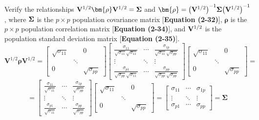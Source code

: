         Verify the relationships $\bold{V}^{1/2}\bm{\rho}\bold{V}^{1/2} = \bold{\Sigma}$ and $\bm{\rho} = {\left(\bold{V}^{1/2}\right)}^{-1}\bold{\Sigma}{\left(\bold{V}^{1/2}\right)}^{-1}$, where $\bold{\Sigma}$ is the
        $p \times p$ population covariance matrix [\textbf{Equation (2-32)}], $\bm{\rho}$ is the $p \times p$ population correlation
        matrix [\textbf{Equation (2-34)}], and $\bold{V}^{1/2}$ is the population standard deviation matrix
        [\textbf{Equation (2-35)}].
        \[
            \mathbf{V}^{1/2}\bm{\rho}\mathbf{V}^{1/2}
            =
            \begin{bmatrix}
                \sqrt{\sigma_{11}} & & 0 \\
                & \ddots & \\
                0 & & \sqrt{\sigma_{pp}}
            \end{bmatrix}
            \begin{bmatrix}
                \frac{\sigma_{11}}{\sqrt{\sigma_{11}}\sqrt{\sigma_{11}}} & \cdots & \frac{\sigma_{1p}}{\sqrt{\sigma_{11}}\sqrt{\sigma_{pp}}} \\
                \vdots & \ddots & \vdots \\
                \frac{\sigma_{p1}}{\sqrt{\sigma_{pp}}\sqrt{\sigma_{11}}} & \cdots & \frac{\sigma_{pp}}{\sqrt{\sigma_{pp}}\sqrt{\sigma_{pp}}}
            \end{bmatrix}
            \begin{bmatrix}
                \sqrt{\sigma_{11}} & & 0 \\
                & \ddots & \\
                0 & & \sqrt{\sigma_{pp}}
            \end{bmatrix}
            =
        \]
        \[
            =
            \begin{bmatrix}
                \frac{\sigma_{11}}{\sqrt{\sigma_{11}}} & \cdots & \frac{\sigma_{1p}}{\sqrt{\sigma_{pp}}} \\
                \vdots & \ddots & \vdots \\
                \frac{\sigma_{p1}}{\sqrt{\sigma_{11}}} & \cdots & \frac{\sigma_{pp}}{\sqrt{\sigma_{pp}}}
            \end{bmatrix}
            \begin{bmatrix}
                \sqrt{\sigma_{11}} & & 0 \\
                & \ddots & \\
                0 & & \sqrt{\sigma_{pp}}
            \end{bmatrix}
            =
            \begin{bmatrix}
                \sigma_{11} & \cdots & \sigma_{1p} \\
                \vdots & \ddots & \vdots \\
                \sigma_{p1} & \cdots & \sigma_{pp}
            \end{bmatrix}
            =
            \mathbf{\Sigma}
        \]
